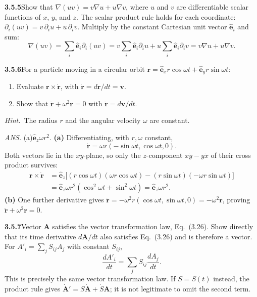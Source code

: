 \par\bigskip
\noindent\textbf{3.5.5}\quad Show that $\nabla(uv)=v\nabla u+u\nabla v$, where
$u$ and $v$ are differentiable scalar functions of $x$, $y$, and $z$.
\solution
The scalar product rule holds for each coordinate:
$\partial_i(uv)=v\,\partial_i u+u\,\partial_i v$.
Multiply by the constant Cartesian unit vector $\hat{\mathbf e}_i$
and sum:
\[
\nabla(uv)=\sum_i\hat{\mathbf e}_i\partial_i(uv)
=v\sum_i\hat{\mathbf e}_i\partial_i u
+u\sum_i\hat{\mathbf e}_i\partial_i v
=\boxed{v\nabla u+u\nabla v}.
\]

\par\bigskip
\noindent\textbf{3.5.6}\quad For a particle moving in a circular orbit
$\mathbf{r}=\hat{\mathbf{e}}_{x}r\cos\omega t+\hat{\mathbf{e}}_{y}r\sin\omega
t$:
\begin{enumerate}
\item[(a)] Evaluate $\mathbf{r}\times\dot{\mathbf{r}}$, with
  $\dot{\mathbf{r}}=d\mathbf{r}/dt=\mathbf{v}$.
\item[(b)] Show that $\ddot{\mathbf{r}}+\omega^{2}\mathbf{r}=0$ with
  $\ddot{\mathbf{r}}=d\mathbf{v}/dt$.
\end{enumerate}
\emph{Hint.}~The radius $r$ and the angular velocity $\omega$ are constant.
\par\nobreak\hfill\emph{ANS.}\enspace
(a)\enspace$\hat{\mathbf{e}}_{z}\omega r^{2}$.
\solution
\textbf{(a)} Differentiating, with $r,\omega$ constant,
\[
\dot{\mathbf r}=\omega r(-\sin\omega t,\cos\omega t,0).
\]
Both vectors lie in the $xy$-plane, so only the $z$-component
$x\dot y-y\dot x$ of their cross product survives:
\[
\begin{aligned}
\mathbf r\times\dot{\mathbf r}
&=\hat{\mathbf e}_z\bigl[(r\cos\omega t)(\omega r\cos\omega t)
-(r\sin\omega t)(-\omega r\sin\omega t)\bigr]\\
&=\hat{\mathbf e}_z\omega r^2
(\cos^2\omega t+\sin^2\omega t)
=\boxed{\hat{\mathbf e}_z\omega r^2}.
\end{aligned}
\]
\textbf{(b)} One further derivative gives
$\ddot{\mathbf r}=-\omega^2r(\cos\omega t,\sin\omega t,0)
=-\omega^2\mathbf r$, proving
$\boxed{\ddot{\mathbf r}+\omega^2\mathbf r=0}$.

\par\bigskip
\noindent\textbf{3.5.7}\quad Vector $\mathbf{A}$ satisfies the vector
transformation law, Eq.~(3.26). Show directly that its time derivative
$d\mathbf{A}/dt$ also satisfies Eq.~(3.26) and is therefore a vector.
\solution
{}
For $A'_i=\sum_jS_{ij}A_j$ with constant $S_{ij}$,
\[
\frac{dA'_i}{dt}=\sum_jS_{ij}\frac{dA_j}{dt}.
\]
This is precisely the same vector transformation law.
If $S=S(t)$ instead, the product rule gives
$\dot{\mathbf A}'=S\dot{\mathbf A}+\dot S\mathbf A$;
it is not legitimate to omit the second term.

